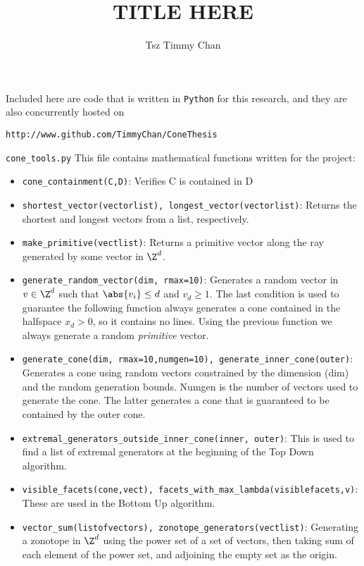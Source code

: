 \documentclass{TC}
\title{TITLE HERE}	%
\author{Tsz Timmy Chan}	%
\begin{document}
Included here are code that is written in \texttt{Python} for this research, and they are also concurrently hosted on 


\begin{center}
\begin{minipage}{.75\textwidth}
\begin{mdframed}
\texttt{http://www.github.com/TimmyChan/ConeThesis}
\end{mdframed}
\end{minipage}
\end{center}

\texttt{cone\_tools.py} This file contains mathematical functions written for the project:
	\begin{itemize}
		\item \texttt{cone\_containment(C,D)}: Verifies C is contained in D
		\item \texttt{shortest\_vector(vectorlist), longest\_vector(vectorlist)}: Returns the shortest and longest vectors from a list, respectively.
		\item \texttt{make\_primitive(vectlist)}: Returns a primitive vector along the ray generated by some vector in $\Z^d$.
		\item \texttt{generate\_random\_vector(dim, rmax=10)}: Generates a random vector in $v \in \Z^d$ such that $\abs{v_i} \leq d$ and $v_d \geq 1$. The last condition is used to guarantee the following function always generates a cone contained in the halfspace $x_d > 0$, so it contains no lines. Using the previous function we always generate a random \emph{primitive} vector.
		
		\item \texttt{generate\_cone(dim, rmax=10,numgen=10), generate\_inner\_cone(outer)}: Generates a cone using random vectors constrained by the dimension (dim) and the random generation bounds. Numgen is the number of vectors used to generate the cone. The latter generates a cone that is guaranteed to be contained by the outer cone.
		
		\item \texttt{extremal\_generators\_outside\_inner\_cone(inner, outer)}: This is used to find a list of extremal generators at the beginning of the Top Down algorithm.
		
		\item \texttt{visible\_facets(cone,vect), facets\_with\_max\_lambda(visiblefacets,v)}: These are used in the Bottom Up algorithm.
		
		\item \texttt{vector\_sum(listofvectors), zonotope\_generators(vectlist)}: Generating a zonotope in $\Z^d$ using the power set of a set of vectors, then taking sum of each element of the power set, and adjoining the empty set as the origin.
				
	\end{itemize}
\end{document}
